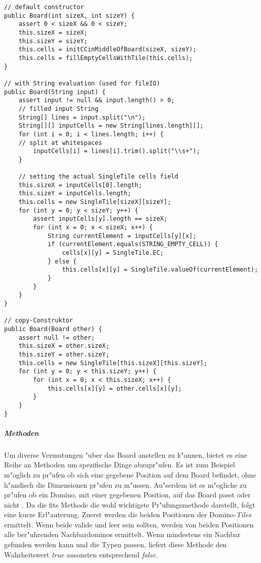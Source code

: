 \begin{lstlisting}[float,style=CodeHighlighting,caption=Board - Konstruktor,label=lst:board_konstruktor]
// default constructor
public Board(int sizeX, int sizeY) {
    assert 0 < sizeX && 0 < sizeY;
    this.sizeX = sizeX;
    this.sizeY = sizeY;
    this.cells = initCCinMiddleOfBoard(sizeX, sizeY);
    this.cells = fillEmptyCellsWithTile(this.cells);
}

// with String evaluation (used for fileIO)
public Board(String input) {
    assert input != null && input.length() > 0;
    // filled input String
    String[] lines = input.split("\n");
    String[][] inputCells = new String[lines.length][];
    for (int i = 0; i < lines.length; i++) {
    // split at whitespaces
        inputCells[i] = lines[i].trim().split("\\s+");
    }

    // setting the actual SingleTile cells field
    this.sizeX = inputCells[0].length;
    this.sizeY = inputCells.length;
    this.cells = new SingleTile[sizeX][sizeY];
    for (int y = 0; y < sizeY; y++) {
        assert inputCells[y].length == sizeX;
        for (int x = 0; x < sizeX; x++) {
            String currentElement = inputCells[y][x];
            if (currentElement.equals(STRING_EMPTY_CELL)) {
                cells[x][y] = SingleTile.EC;
            } else {
                this.cells[x][y] = SingleTile.valueOf(currentElement);
            }
        }
    }
}

// copy-Construktor
public Board(Board other) {
    assert null != other;
    this.sizeX = other.sizeX;
    this.sizeY = other.sizeY;
    this.cells = new SingleTile[this.sizeX][this.sizeY];
    for (int y = 0; y < this.sizeY; y++) {
        for (int x = 0; x < this.sizeX; x++) {
            this.cells[x][y] = other.cells[x][y];
        }
    }
}
\end{lstlisting}

\subparagraph{Methoden}
Um diverse Vermutungen "uber das Board anstellen zu k"onnen, bietet es eine Reihe an Methoden um spezifische Dinge abzupr"ufen. Es ist zum Beispiel m"oglich zu pr"ufen ob sich eine gegebene Position auf dem Board befindet, ohne h"andisch die Dimensionen pr"ufen zu m"ussen. Au"serdem ist es m"ogliche zu pr"ufen ob ein Domino, mit einer gegebenen Position, auf das Board passt oder nicht . Da die fits Methode die wohl wichtigste Pr"ufungsmethode darstellt, folgt eine kurze Erl"auterung. Zuerst werden die beiden Positionen der Domino-\emph{Tiles} ermittelt. Wenn beide valide und leer sein sollten, werden von beiden Positionen alle ber"uhrenden Nachbardominos ermittelt. Wenn mindestens ein Nachbar gefunden werden kann und die Typen passen, liefert diese Methode den Wahrheitswert \emph{true} ansonsten entsprechend \emph{false}. 

